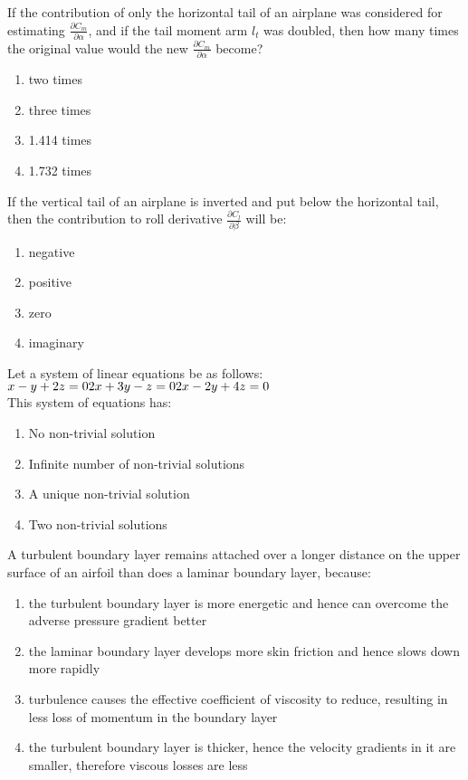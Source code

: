     \item If the contribution of only the horizontal tail of an airplane was considered for estimating $\frac{\partial C_m}{\partial \alpha}$, and if the tail moment arm $l_t$ was doubled, then how many times the original value would the new $\frac{\partial C_m}{\partial \alpha}$ become?
    \begin{enumerate}
        \item two times
        \item three times
        \item 1.414 times
        \item 1.732 times
    \end{enumerate}

    \item If the vertical tail of an airplane is inverted and put below the horizontal tail, then the contribution to roll derivative $\frac{\partial C_l}{\partial \beta}$ will be:
    \begin{enumerate}
        \item negative
        \item positive
        \item zero
        \item imaginary
    \end{enumerate}

    \item Let a system of linear equations be as follows:\\
    $x - y + 2z = 0\\
    2x + 3y - z = 0\\
    2x - 2y + 4z = 0$\\
    This system of equations has:
    \begin{enumerate}
        \item No non-trivial solution
        \item Infinite number of non-trivial solutions
        \item A unique non-trivial solution
        \item Two non-trivial solutions
    \end{enumerate}

    \item A turbulent boundary layer remains attached over a longer distance on the upper surface of an airfoil than does a laminar boundary layer, because:
    \begin{enumerate}
        \item the turbulent boundary layer is more energetic and hence can overcome the adverse pressure gradient better
        \item the laminar boundary layer develops more skin friction and hence slows down more rapidly
        \item turbulence causes the effective coefficient of viscosity to reduce, resulting in less loss of momentum in the boundary layer
        \item the turbulent boundary layer is thicker, hence the velocity gradients in it are smaller, therefore viscous losses are less
    \end{enumerate}

